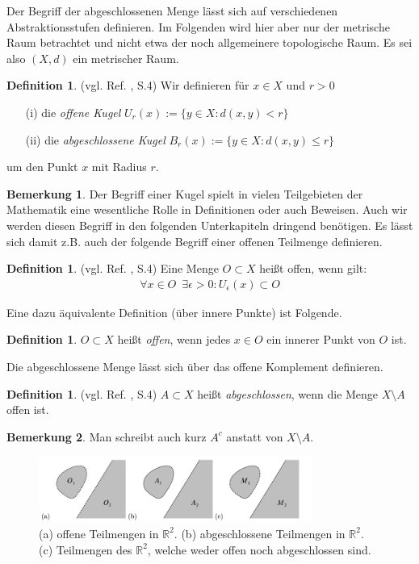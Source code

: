 \documentclass[10pt,a4paper]{article}
\theoremstyle{plain}
\theoremstyle{definition}
\newtheorem{definition}[satz]{Definition}
\newenvironment{dfi}{\begin{shaded}\begin{definition}}{\end{definition}\end{shaded}}
\theoremstyle{nonumberplain}
\newtheorem{bemerkung}{Bemerkung}
\newenvironment{bem}{\begin{bemerkung}}{\end{bemerkung}}
\newcommand{\R}{\mathbb{R}}
\begin{document}
Der Begriff der abgeschlossenen Menge lässt sich auf verschiedenen Abstraktionsstufen definieren. Im Folgenden wird hier aber nur der metrische Raum betrachtet und nicht etwa der noch allgemeinere topologische Raum. Es sei also $(X, d)$ ein metrischer Raum.
\begin{dfi}
(vgl. Ref. \cite{Clason}, S.4) Wir definieren für $x \in X$ und $r >0$
\begin{itemize}
\item[(i)] die \textit{offene Kugel} $U_r (x) := \{y \in X : d(x, y) < r \}$ 
\item[(ii)] die \textit{abgeschlossene Kugel} $B_r (x) := \{y \in X : d(x, y) \leq r \}$ 
\end{itemize}
um den Punkt $x$ mit Radius $r$.
\end{dfi}
\begin{bem}
Der Begriff einer Kugel spielt in vielen Teilgebieten der Mathematik eine wesentliche Rolle in Definitionen oder auch Beweisen. Auch wir werden diesen Begriff in den folgenden Unterkapiteln dringend benötigen. Es lässt sich damit z.B. auch der folgende Begriff einer offenen Teilmenge definieren.
\end{bem}
\begin{dfi}
(vgl. Ref. \cite{Clason}, S.4) Eine Menge $O \subset X$ heißt offen, wenn gilt:
\begin{align*}
 \forall x \in O \enspace \exists \epsilon > 0 : U_\epsilon(x) \subset O
\end{align*}
\end{dfi}
Eine dazu äquivalente Definition (über innere Punkte) ist Folgende.
\begin{dfi}
$O \subset X$ heißt \textit{offen}, wenn jedes $x \in O$ ein innerer Punkt von $O$ ist.
\end{dfi}
\noindent Die abgeschlossene Menge lässt sich über das offene Komplement definieren.
\begin{dfi}
(vgl. Ref. \cite{Clason}, S.4) $A \subset X$ heißt \textit{abgeschlossen}, wenn die Menge $X \setminus A$ offen ist.
\end{dfi}
\begin{bem}
Man schreibt auch kurz $A^c$ anstatt von $X \setminus A$.
\end{bem}
\begin{figure}[h]
\centering
\includegraphics[width=0.80\textwidth]{pictures/offene-abgeschlossene-mengen.png}
\caption{(a) offene Teilmengen in $\R^2$. (b) abgeschlossene Teilmengen in $\R^2$. (c) Teilmengen des $\R^2$, welche weder offen noch abgeschlossen sind. \cite{OffeneAbgeschlosseneMengen}}
\end{figure}
\end{document}
